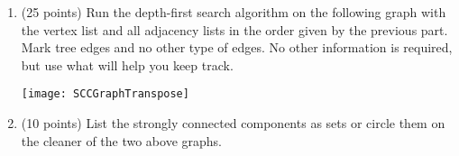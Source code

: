 \documentclass[12 pt]{amsart}
\begin{document}
\begin{enumerate}[label=\arabic*.)]
	\bigskip
	
	\pagebreak
	
	\item (25 points) Run the depth-first search algorithm on the following graph with the vertex list and all adjacency lists in the order given by the previous part.
	Mark tree edges and no other type of edges.
	No other information is required, but use what will help you keep track.
	
	\smallskip
	
	\begin{center}
		\texttt{[image: SCCGraphTranspose]}
	\end{center}
	
	\bigskip
	
	\item (10 points) List the strongly connected components as sets or circle them on the cleaner of the two above graphs.

\end{enumerate}
\end{document}
